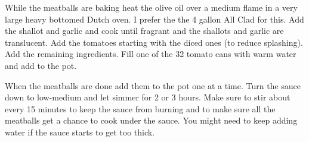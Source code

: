 \begin{IngredientsAndSteps}
    {
        While the meatballs are baking heat the olive oil over a medium flame in a very large heavy bottomed Dutch oven.
        I prefer the the 4 gallon All Clad for this. Add the shallot and garlic and cook until fragrant and the shallots
        and garlic are translucent. Add the tomatoes starting with the diced ones (to reduce splashing). Add the remaining
        ingredients. Fill one of the 32 \Ounce tomato cans with warm water and add to the pot.
    }

    {
        When the meatballs are done add them to the pot one at a time. Turn the sauce down to low-medium and let simmer
        for 2 or 3 hours. Make sure to stir about every 15 minutes to keep the sauce from burning and to make sure all the
        meatballs get a chance to cook under the sauce. You might need to keep adding water if the sauce starts to get too
        thick.
    }

\end{IngredientsAndSteps}

%
%
%
%
\newpage



%
%
%
%
\newpage



